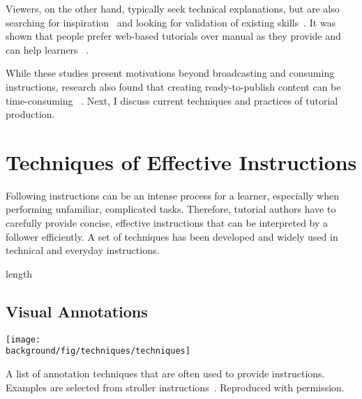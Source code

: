 Viewers, on the other hand, typically seek technical explanations, but are also searching for inspiration~\cite{Torrey:2009fc} and looking for validation of existing skills~\cite{Lafreniere:2012tl}.
%
It was shown that people prefer web-based tutorials over manual as they provide  and can help learners ~\cite{BenLafreniere:2013ux}.

While these studies present motivations beyond broadcasting and consuming instructions, research also found that creating ready-to-publish content can be time-consuming ~\cite{Kuznetsov:2010:REA:1868914.1868950}. Next, I discuss current techniques and practices of tutorial production.



\section{Techniques of Effective Instructions}
\label{background_techniques}

Following instructions can be an intense process for a learner, especially when performing unfamiliar, complicated tasks. Therefore, tutorial authors have to carefully provide concise, effective instructions that can be interpreted by a follower efficiently. A set of techniques has been developed and widely used in technical and everyday instructions.

length~\cite{Black:1986:KMI:29933.275623}


\subsection{Visual Annotations}

\begin{table*}[!htbp]
  \centering
  \texttt{[image: \\background/fig/techniques/techniques]}
  \caption{A list of annotation techniques that are often used to provide instructions. Examples are selected from stroller instructions~\cite{MountainBuggyInstructions}. Reproduced with permission.}
  \label{background_annotation_techniques}
\end{table*}


